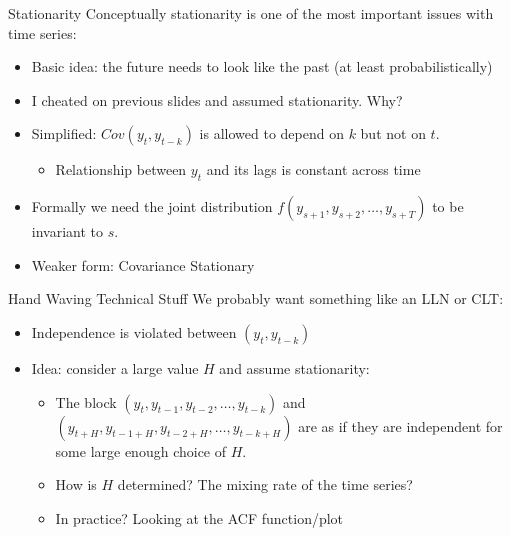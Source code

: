 \begin{frame}{Stationarity}
Conceptually \alert{stationarity} is one of the most important issues with time series:
\begin{itemize}
\item Basic idea: the future needs to look like the past (at least probabilistically)
\item I cheated on previous slides and assumed stationarity. Why?
\item Simplified: $Cov(y_t,y_{t-k})$ is allowed to depend on $k$ but not on $t$.
\begin{itemize}
\item Relationship between $y_t$ and its lags is constant across time
\end{itemize}
\item Formally we need the joint distribution $f(y_{s+1},y_{s+2},\ldots,y_{s+T})$ to be invariant to $s$.
\item Weaker form: Covariance Stationary
\end{itemize}
\end{frame}

\begin{frame}{Hand Waving Technical Stuff}
We probably want something like an LLN or CLT:
\begin{itemize}
\item \alert{Independence} is violated between $(y_t,y_{t-k})$
\item Idea: consider a large value $H$ and assume \alert{stationarity}:
\begin{itemize}
\item The block $(y_t,y_{t-1},y_{t-2},\ldots,y_{t-k})$ and $(y_{t+H},y_{t-1+H},y_{t-2+H},\ldots,y_{t-k+H})$ are as if they are independent for some large enough choice of $H$.
\item How is $H$ determined? The \alert{mixing rate} of the time series?
\item In practice? Looking at the ACF function/plot
\end{itemize}
\end{itemize}
\end{frame}


